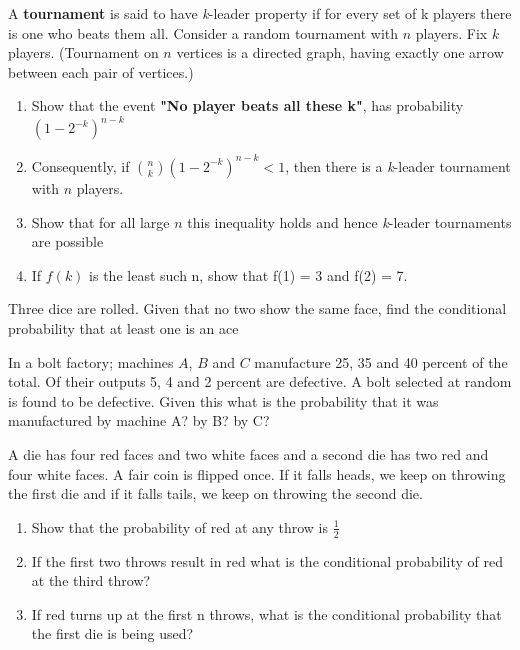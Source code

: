 \documentclass[12pt]{article}
\newenvironment{question}[2][Question]{\begin{trivlist}
\item[\hskip \labelsep {\bfseries #1}\hskip \labelsep {\bfseries #2.}]}{\end{trivlist}}
\begin{document}
\begin{question}{7}
A \textbf{tournament} is said to have \textit{k}-leader property if for every set of k players there is one who beats them all. Consider a random tournament with $n$ players. Fix $k$ players. (Tournament on $n$ vertices is a directed graph, having exactly one arrow between each pair of vertices.)
\begin{enumerate}
\item Show that the event \textbf{"No player beats all these k"}, has probability $(1-2^{-k})^{n-k}$
\item Consequently, if ${n \choose k}(1-2^{-k})^{n-k} < 1$, then there is a \textit{k}-leader tournament with $n$ players.
\item Show that for all large $n$ this inequality holds and hence \textit{k}-leader tournaments are possible
\item If $f(k)$ is the least such n, show that f(1) = 3 and f(2) = 7. 
\end{enumerate}
\end{question}

\begin{question}{8}
Three dice are rolled. Given that no two show the same face, find the conditional probability that at least one is an ace
\end{question}

\begin{question}{9}
In a bolt factory; machines $A$, $B$ and $C$ manufacture 25, 35 and 40 percent of the total. Of their outputs 5, 4 and 2 percent are defective. A bolt selected at random is found to be defective. Given this what is the probability that it was manufactured by machine A? by B? by C?
\end{question}

\begin{question}{10}
A die has four red faces and two white faces and a second die has two red and four white faces. A fair coin is flipped once. If it falls heads, we keep on throwing the first die and if it falls tails, we keep on throwing the second die.
\begin{enumerate}
\item Show that the probability of red at any throw is $\frac{1}{2}$
\item If the first two throws result in red what is the conditional probability of red at the third throw?
\item If red turns up at the first n throws, what is the conditional probability that the first die is being used?
\end{enumerate}
\end{question}
\end{document}
